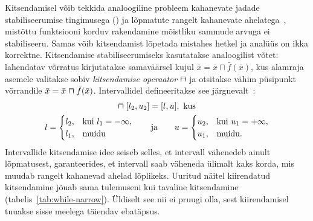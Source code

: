 \documentclass[../thesis.tex]{subfiles}
\begin{document}
Kitsendamisel võib tekkida analoogiline probleem kahanevate jadade stabiliseerumise tingimusega () ja lõpmatute rangelt kahanevate ahelatega~\cite[65]{seidl_foundations}, mistõttu funktsiooni korduv rakendamine mõistliku sammude arvuga ei stabiliseeru. Samas võib kitsendamist lõpetada mistahes hetkel ja analüüs on ikka korrektne. Kitsendamise stabiliseerumiseks kasutatakse analoogilist võtet: lahendatav võrratus kirjutatakse samaväärsel kujul $\bar{x} = \bar{x} \sqcap \bar{f}(\bar{x})$, kus alamraja asemele valitakse sobiv \emph{kitsendamise operaator} $\narrow$ ja otsitakse vähim püsipunkt võrrandile $\bar{x} = \bar{x} \narrow \bar{f}(\bar{x})$. Intervallidel defineeritakse see järgnevalt~\cite[66]{seidl_foundations}:
\begin{gather*}
	[l_1, u_1] \narrow [l_2, u_2] = [l, u], \text{ kus} \\
	l = \begin{cases}
		l_2, & \text{kui } l_1 = -\infty, \\
		l_1, & \text{muidu}
	\end{cases}
	\qquad \text{ja} \qquad
	u = \begin{cases}
		u_2, & \text{kui } u_1 = +\infty, \\
		u_1, & \text{muidu}.
	\end{cases}
\end{gather*}
Intervallide kitsendamise idee seiseb selles, et intervall vähenedeb ainult lõpmatusest, garanteerides, et intervall saab väheneda ülimalt kaks korda, mis muudab rangelt kahanevad ahelad lõplikeks. Uuritud näitel kiirendatud kitsendamine jõuab sama tulemuseni kui tavaline kitsendamine (tabelis~\ref{tab:while-narrow}). Üldiselt see nii ei pruugi olla, sest kiirendamisel tuuakse sisse meelega täiendav ebatäpsus.
\end{document}

